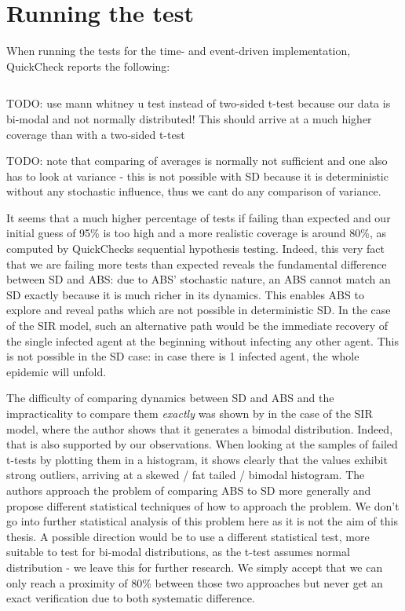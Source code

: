 \section{Running the test}
When running the tests for the time- and event-driven implementation, QuickCheck reports the following:

\begin{verbatim}

\end{verbatim}

TODO: use mann whitney u test instead of two-sided t-test because our data is bi-modal and not normally distributed! This should arrive at a much higher coverage than with a two-sided t-test

TODO: note that comparing of averages is normally not sufficient and one also has to look at variance - this is not possible with SD because it is deterministic without any stochastic influence, thus we cant do any comparison of variance.

It seems that a much higher percentage of tests if failing than expected and our initial guess of 95\% is too high and a more realistic coverage is around 80\%, as computed by QuickChecks sequential hypothesis testing. Indeed, this very fact that we are failing more tests than expected reveals the fundamental difference between SD and ABS: due to ABS' stochastic nature, an ABS cannot match an SD exactly because it is much richer in its dynamics. This enables ABS to explore and reveal paths which are not possible in deterministic SD. In the case of the SIR model, such an alternative path would be the immediate recovery of the single infected agent at the beginning without infecting any other agent. This is not possible in the SD case: in case there is 1 infected agent, the whole epidemic will unfold.

The difficulty of comparing dynamics between SD and ABS and the impracticality to compare them \textit{exactly} was shown by \cite{macal_agent-based_2010} in the case of the SIR model, where the author shows that it generates a bimodal distribution. Indeed, that is also supported by our observations. When looking at the samples of failed t-tests by plotting them in a histogram, it shows clearly that the values exhibit strong outliers, arriving at a skewed / fat tailed / bimodal histogram. %
The authors \cite{figueredo_comparing_2014} approach the problem of comparing ABS to SD more generally and propose different statistical techniques of how to approach the problem.
We don't go into further statistical analysis of this problem here as it is not the aim of this thesis. A possible direction would be to use a different statistical test, more suitable to test for bi-modal distributions, as the t-test assumes normal distribution - we leave this for further research. We simply accept that we can only reach a proximity of 80\% between those two approaches but never get an exact verification due to both systematic difference.

